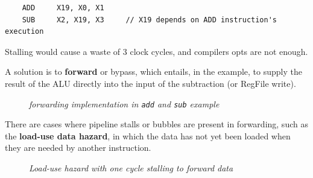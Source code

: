 \documentclass[11pt]{article}
\begin{document}
\begin{verbatim}
    ADD     X19, X0, X1
    SUB     X2, X19, X3     // X19 depends on ADD instruction's execution
\end{verbatim}

Stalling would cause a waste of 3 clock cycles, and compilers opts are not enough.

A solution is to \textbf{forward} or bypass, which entails, in the example, to supply the result of the ALU directly into the input of the subtraction (or RegFile write).

\begin{figure}[htbp]
    \centering
    \caption{\textit{forwarding implementation in \texttt{add} and \texttt{sub} example}}
\end{figure}

There are cases where pipeline stalls or bubbles are present in forwarding, such as the \textbf{load-use data hazard}, in which the data has not yet been loaded when they are needed by another instruction.

\begin{figure}[htbp]
    \centering
    \caption{\textit{Load-use hazard with one cycle stalling to forward data}}
\end{figure}
\end{document}
